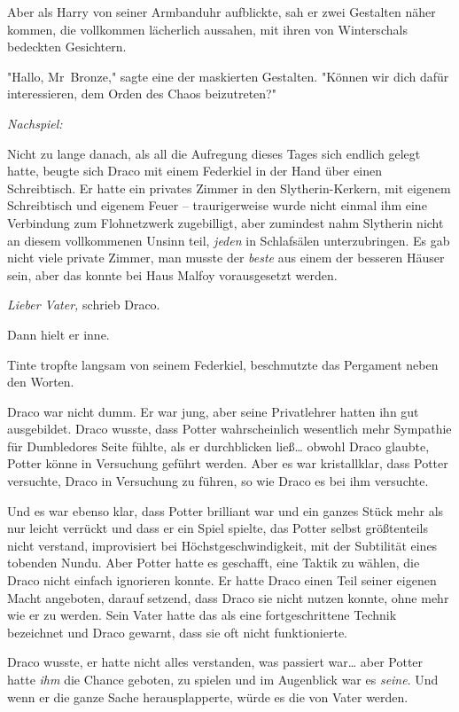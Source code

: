 {Aber als Harry von seiner Armbanduhr aufblickte, sah er zwei Gestalten näher kommen, die vollkommen lächerlich aussahen, mit ihren von Winterschals bedeckten Gesichtern.

"Hallo, Mr~Bronze," sagte eine der maskierten Gestalten. "Können wir dich dafür interessieren, dem Orden des Chaos beizutreten?"

\later

\emph{Nachspiel:}

Nicht zu lange danach, als all die Aufregung dieses Tages sich endlich gelegt hatte, beugte sich Draco mit einem Federkiel in der Hand über einen Schreibtisch. Er hatte ein privates Zimmer in den Slytherin-Kerkern, mit eigenem Schreibtisch und eigenem Feuer -- traurigerweise wurde nicht einmal ihm eine Verbindung zum Flohnetzwerk zugebilligt, aber zumindest nahm Slytherin nicht an diesem vollkommenen Unsinn teil, \emph{jeden} in Schlafsälen unterzubringen. Es gab nicht viele private Zimmer, man musste der \emph{beste} aus einem der besseren Häuser sein, aber das konnte bei Haus Malfoy vorausgesetzt werden.

\emph{Lieber Vater,} schrieb Draco.

Dann hielt er inne.

Tinte tropfte langsam von seinem Federkiel, beschmutzte das Pergament neben den Worten.

Draco war nicht dumm. Er war jung, aber seine Privatlehrer hatten ihn gut ausgebildet. Draco wusste, dass Potter wahrscheinlich wesentlich mehr Sympathie für Dumbledores Seite fühlte, als er durchblicken ließ… obwohl Draco glaubte, Potter könne in Versuchung geführt werden. Aber es war kristallklar, dass Potter versuchte, Draco in Versuchung zu führen, so wie Draco es bei ihm versuchte.

Und es war ebenso klar, dass Potter brilliant war und ein ganzes Stück mehr als nur leicht verrückt und dass er ein Spiel spielte, das Potter selbst größtenteils nicht verstand, improvisiert bei Höchstgeschwindigkeit, mit der Subtilität eines tobenden Nundu. Aber Potter hatte es geschafft, eine Taktik zu wählen, die Draco nicht einfach ignorieren konnte. Er hatte Draco einen Teil seiner eigenen Macht angeboten, darauf setzend, dass Draco sie nicht nutzen konnte, ohne mehr wie er zu werden. Sein Vater hatte das als eine fortgeschrittene Technik bezeichnet und Draco gewarnt, dass sie oft nicht funktionierte.

Draco wusste, er hatte nicht alles verstanden, was passiert war… aber Potter hatte \emph{ihm} die Chance geboten, zu spielen und im Augenblick war es \emph{seine}. Und wenn er die ganze Sache herausplapperte, würde es die von Vater werden.

}
